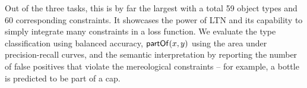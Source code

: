 \documentclass{article}
\theoremstyle{definition}
\begin{document}
Out of the three tasks, this is by far the largest with a total 59 object types and 60 corresponding constraints.
It showcases the power of LTN and its capability to simply integrate many constraints in a loss function. 
We evaluate the type classification using balanced accuracy, $\mathsf{partOf}(x,y)$ using the area under precision-recall curves, 
and the semantic interpretation by reporting the number of false positives that violate the mereological constraints -- for example, a bottle is predicted to be part of a cap.

\end{document}
